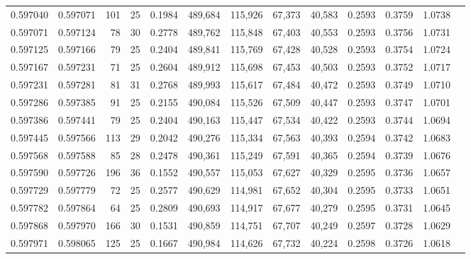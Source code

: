 \begin{tabular}{rrrrrrrrrrrrr}
0.597040 & 0.597071 & 101 &  25 &                                     0.1984 & 489,684 & 115,926 &  67,373 &  40,583 & 0.2593 & 0.3759 & 1.0738 \\
0.597071 & 0.597124 &  78 &  30 &                                     0.2778 & 489,762 & 115,848 &  67,403 &  40,553 & 0.2593 & 0.3756 & 1.0731 \\
0.597125 & 0.597166 &  79 &  25 &                                     0.2404 & 489,841 & 115,769 &  67,428 &  40,528 & 0.2593 & 0.3754 & 1.0724 \\
0.597167 & 0.597231 &  71 &  25 &                                     0.2604 & 489,912 & 115,698 &  67,453 &  40,503 & 0.2593 & 0.3752 & 1.0717 \\
0.597231 & 0.597281 &  81 &  31 &                                     0.2768 & 489,993 & 115,617 &  67,484 &  40,472 & 0.2593 & 0.3749 & 1.0710 \\
0.597286 & 0.597385 &  91 &  25 &                                     0.2155 & 490,084 & 115,526 &  67,509 &  40,447 & 0.2593 & 0.3747 & 1.0701 \\
0.597386 & 0.597441 &  79 &  25 &                                     0.2404 & 490,163 & 115,447 &  67,534 &  40,422 & 0.2593 & 0.3744 & 1.0694 \\
0.597445 & 0.597566 & 113 &  29 &                                     0.2042 & 490,276 & 115,334 &  67,563 &  40,393 & 0.2594 & 0.3742 & 1.0683 \\
0.597568 & 0.597588 &  85 &  28 &                                     0.2478 & 490,361 & 115,249 &  67,591 &  40,365 & 0.2594 & 0.3739 & 1.0676 \\
0.597590 & 0.597726 & 196 &  36 &                                     0.1552 & 490,557 & 115,053 &  67,627 &  40,329 & 0.2595 & 0.3736 & 1.0657 \\
0.597729 & 0.597779 &  72 &  25 &                                     0.2577 & 490,629 & 114,981 &  67,652 &  40,304 & 0.2595 & 0.3733 & 1.0651 \\
0.597782 & 0.597864 &  64 &  25 &                                     0.2809 & 490,693 & 114,917 &  67,677 &  40,279 & 0.2595 & 0.3731 & 1.0645 \\
0.597868 & 0.597970 & 166 &  30 &                                     0.1531 & 490,859 & 114,751 &  67,707 &  40,249 & 0.2597 & 0.3728 & 1.0629 \\
0.597971 & 0.598065 & 125 &  25 &                                     0.1667 & 490,984 & 114,626 &  67,732 &  40,224 & 0.2598 & 0.3726 & 1.0618 \\

\end{tabular}
